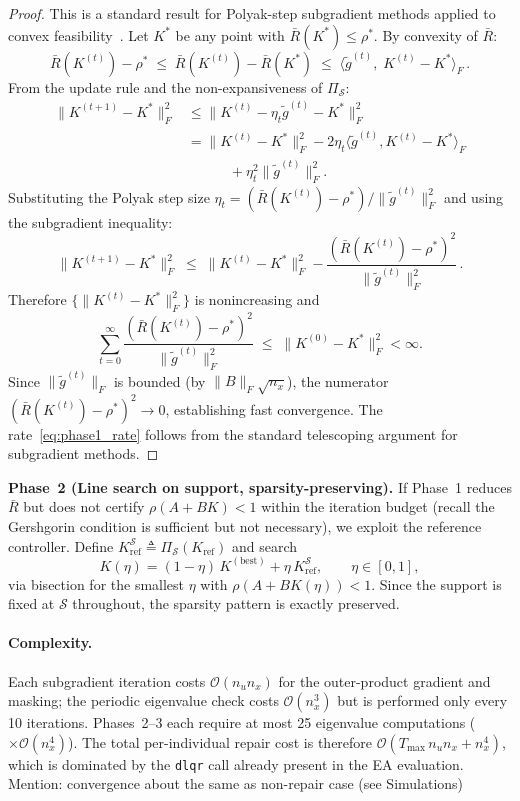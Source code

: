 \documentclass[conference]{IEEEtran}
\begin{document}
\begin{proof}
This is a standard result for Polyak-step subgradient methods applied
to convex feasibility~\cite{fazel2018global}.  Let $K^*$ be
any point with $\bar{R}(K^*)\le\rho^*$.  By convexity of $\bar{R}$:
\[
  \bar{R}(K^{(t)})-\rho^*
  \;\le\;
  \bar{R}(K^{(t)})-\bar{R}(K^*)
  \;\le\;
  \bigl\langle \tilde{g}^{(t)},\; K^{(t)}-K^* \bigr\rangle_F\,.
\]
From the update rule and the non-expansiveness of $\Pi_{\mathcal{S}}$:
\begin{align*}
\|K^{(t+1)}-K^*\|_F^2
&\le \|K^{(t)}-\eta_t\tilde{g}^{(t)}-K^*\|_F^2 \\
&= \|K^{(t)}-K^*\|_F^2
   - 2\eta_t\big\langle\tilde{g}^{(t)},K^{(t)}-K^*\big\rangle_F \\
&\qquad\quad + \eta_t^2\|\tilde{g}^{(t)}\|_F^2 .
\end{align*}
Substituting the Polyak step size $\eta_t =
(\bar{R}(K^{(t)})-\rho^*)/\|\tilde{g}^{(t)}\|_F^2$ and using
the subgradient inequality:
\[
  \|K^{(t+1)}-K^*\|_F^2
  \;\le\;
  \|K^{(t)}-K^*\|_F^2
  - \frac{(\bar{R}(K^{(t)})-\rho^*)^2}{\|\tilde{g}^{(t)}\|_F^2}\,.
\]
Therefore $\{\|K^{(t)}-K^*\|_F^2\}$ is nonincreasing and
\[
  \sum_{t=0}^{\infty}
  \frac{(\bar{R}(K^{(t)})-\rho^*)^2}{\|\tilde{g}^{(t)}\|_F^2}
  \;\le\; \|K^{(0)}-K^*\|_F^2 < \infty.
\]
Since $\|\tilde{g}^{(t)}\|_F$ is bounded (by
$\|B\|_F\sqrt{n_x}$), the numerator
$(\bar{R}(K^{(t)})-\rho^*)^2\to 0$, establishing fast convergence.
The rate~\eqref{eq:phase1_rate} follows from the standard telescoping
argument for subgradient methods.
\end{proof}

\medskip\noindent
\textbf{Phase~2 (Line search on support, sparsity-preserving).}
If Phase~1 reduces $\bar{R}$ but does not certify
$\rho(A+BK)<1$ within the iteration budget (recall the Gershgorin
condition is sufficient but not necessary), we exploit the reference
controller.  Define
$K_{\mathrm{ref}}^{\mathcal{S}}\triangleq\Pi_{\mathcal{S}}(K_{\mathrm{ref}})$
and search
\begin{equation}\label{eq:phase2}
  K(\eta) = (1-\eta)\,K^{(\mathrm{best})} + \eta\,K_{\mathrm{ref}}^{\mathcal{S}},
  \qquad \eta\in[0,1],
\end{equation}
via bisection for the smallest $\eta$ with
$\rho(A+BK(\eta))<1$.  Since the support is fixed at $\mathcal{S}$
throughout, the sparsity pattern is exactly preserved.

\medskip\noindent


\paragraph{Complexity.}
Each subgradient iteration costs $\mathcal{O}(n_u n_x)$ for the
outer-product gradient and masking; the periodic eigenvalue check costs
$\mathcal{O}(n_x^3)$ but is performed only every 10 iterations.
Phases~2--3 each require at most 25 eigenvalue computations
($\times\mathcal{O}(n_x^4)$).  The total per-individual repair cost
is therefore $\mathcal{O}(T_{\max}\,n_un_x + n_x^4)$, which is
dominated by the \texttt{dlqr} call already present in the EA
evaluation. 
Mention: convergence about the same as non-repair case (see Simulations)
\end{document}
